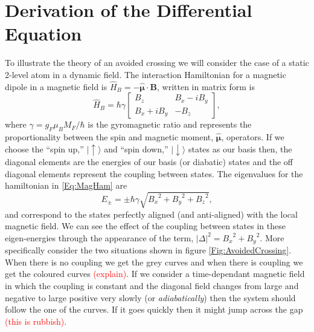 
\section{Derivation of the Differential Equation}

To illustrate the theory of an avoided crossing we will consider the case of a static 2-level atom in a dynamic field. 
The interaction Hamiltonian for a magnetic dipole in a magnetic field is $\widehat{H}_{B} = -\hat{\boldsymbol{\mu}} \cdot \boldsymbol{B}$, written in matrix form is
\begin{equation}
	\widehat{H}_{B} = \hbar \gamma \begin{bmatrix} B_{z} & B_{x} - i B_{y}\\
											B_{x} + i B_{y} & -B_{z} \end{bmatrix}, \label{Eq:MagHam}
\end{equation}
where $\gamma = g_{F}\mu_{B}M_{F} / \hbar$ is the gyromagnetic ratio and represents the proportionality between the spin and magnetic moment, $\hat{\boldsymbol{\mu}}$, operators. 
If we choose the ``spin up,'' $\vert\uparrow\rangle$ and ``spin down,'' $\vert \downarrow\rangle$ states as our basis then, the diagonal elements are the energies of our basis (or diabatic) states and the off diagonal elements represent the coupling between states. 
The eigenvalues for the hamiltonian in \eqref{Eq:MagHam} are 
\begin{equation}
	E_{\pm} = \pm \hbar \gamma \sqrt{{B_{x}}^{2} + {B_{y}}^{2} + {B_{z}}^{2}},
\end{equation}
and correspond to the states perfectly aligned (and anti-aligned) with the local magnetic field. 
We can see the effect of the coupling between states in these eigen-energies through the appearance of the term, $\left\vert\Delta\right\vert^{2} = {B_{x}}^{2} + {B_{y}}^{2}$. 
More specifically consider the two situations shown in figure \ref{Fig:AvoidedCrossing}. 
When there is no coupling we get the grey curves and when there is coupling we get the coloured curves \textcolor{red}{(explain)}. 
If we consider a time-dependant magnetic field in which the coupling is constant and the diagonal field changes from large and negative to large positive very slowly (or \emph{adiabatically}) then the system should follow the one of the curves. 
If it goes quickly then it might jump across the gap \textcolor{red}{(this is rubbish)}.

